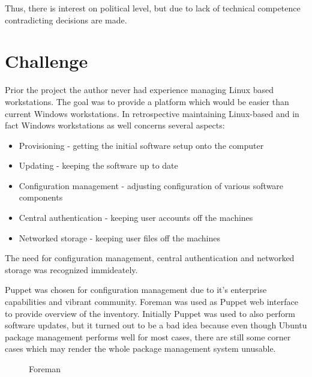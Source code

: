 \documentclass{article}
\begin{document}
Thus, there is interest on political level, but due to lack
of technical competence contradicting decisions are made.



\section{Challenge}

Prior the project the author never had experience managing Linux based workstations.
The goal was to provide a platform which would be easier than current Windows
workstations.
In retrospective maintaining Linux-based and in fact
Windows workstations as well concerns several aspects:

\begin{itemize}
\item Provisioning - getting the initial software setup onto the computer
\item Updating - keeping the software up to date
\item Configuration management - adjusting configuration of various software components
\item Central authentication - keeping user accounts off the machines
\item Networked storage - keeping user files off the machines
\end{itemize}

The need for configuration management, central authentication
and networked storage was recognized immideately.


Puppet was chosen for configuration management due to it's
enterprise capabilities and vibrant community.
Foreman was used as Puppet web interface to provide
overview of the inventory.
Initially Puppet was used to also perform software updates, but
it turned out to be a bad idea because even though Ubuntu package
management performs well for most cases, there are still some
corner cases which may render the whole package management
system unusable.

\begin{figure}[!htb]
\centering
{}
\caption{Foreman}
\label{fig:digraph}
\end{figure}
\end{document}
